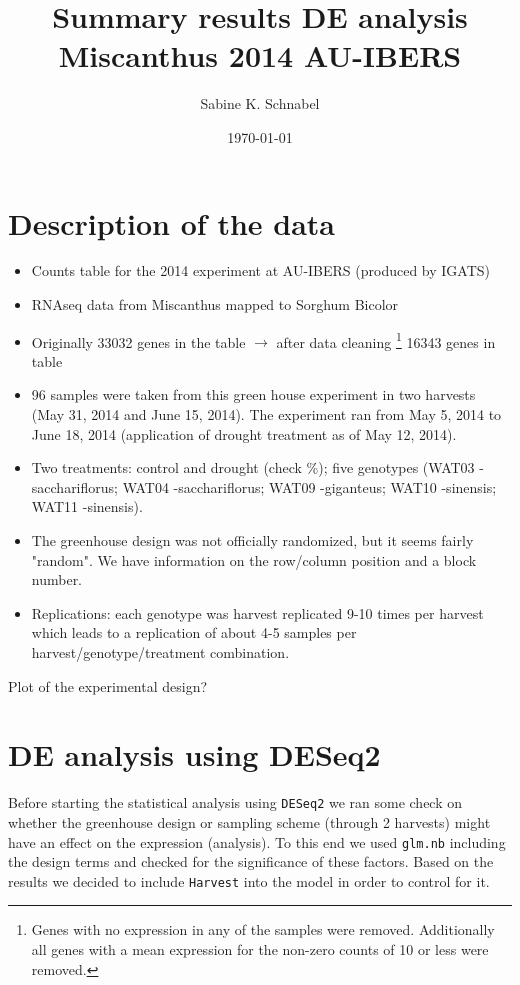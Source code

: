 \documentclass[12pt, a4paper]{article}
\title{Summary results DE analysis Miscanthus 2014 AU-IBERS}
\author{Sabine K. Schnabel}
\date{\today}
\begin{document}
\maketitle

\section*{Description of the data}
\begin{itemize}
\item Counts table for the 2014 experiment at AU-IBERS (produced by IGATS)
\item RNAseq data from Miscanthus mapped to Sorghum Bicolor
\item Originally 33032 genes in the table $\rightarrow$ after data cleaning
\footnote{Genes with no expression in any of the samples were removed. Additionally all genes with a mean expression for the non-zero counts of 10 or less were removed.} 
16343 genes in table 
\item 96 samples were taken from this green house experiment in two harvests (May 31, 2014 and June 15, 2014). The 
experiment ran from May 5, 2014 to June 18, 2014 (application of drought treatment as of May 12, 2014).
\item Two treatments: control and drought (check \%); five genotypes (WAT03 -sacchariflorus; 
WAT04 -sacchariflorus; 
WAT09 -giganteus; 
WAT10 -sinensis; 
WAT11 -sinensis).
\item The greenhouse design was not officially randomized, but it seems fairly "random". We have information on
the row/column position and a block number.
\item Replications: each genotype was harvest replicated 9-10 times per harvest which leads to a replication of about 4-5 samples per harvest/genotype/treatment combination. 
\end{itemize}
Plot of the experimental design?

\section*{DE analysis using DESeq2}
Before starting the statistical analysis using \texttt{DESeq2} we ran some check on whether the greenhouse design or 
sampling scheme (through 2 harvests) might have an effect on the expression (analysis). 
To this end we used \texttt{glm.nb} including the design terms and checked for the significance of these factors. 
Based on the results we decided to include \texttt{Harvest} into the model in order to control for it.
\end{document}
